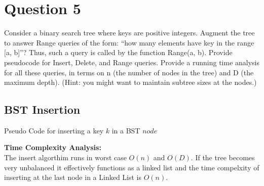 \documentclass{article}
\begin{document}
\section*{Question 5}
Consider a binary search tree where keys are positive integers.
Augment the tree to answer Range queries of the form: “how many elements
have key in the range [a, b]”? Thus, such a query is called by the
function Range(a, b).
Provide pseudocode for Insert, Delete, and Range queries. Provide a running
time analysis for all these queries, in terms on n (the number of
nodes in the tree) and D (the maximum depth). (Hint: you might want
to maintain subtree sizes at the nodes.)\\

\subsection*{BST Insertion}
\begin{algorithm}
\begin{algorithmic}
	\ENDIF
\ENDIF
{}

\end{algorithmic}
\caption{Pseudo Code for inserting a key $k$ in a BST $node$}
\end{algorithm}

\textbf{Time Complexity Analysis:} \\
The insert algorthim runs in worst case $O(n)$ and $O(D)$. If the tree
becomes very unbalanced it effectively functions as a linked list and the time 
compelxity of inserting at the last node in a Linked List is $O(n)$.

\newpage
\end{document}
